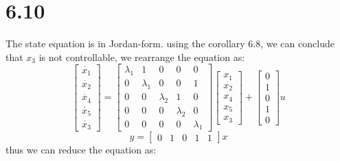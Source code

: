 \documentclass{article}
\begin{document}
\section*{6.10}
The state equation is in Jordan-form.
using the corollary 6.8, we can conclude that $x_3$ is not controllable, we rearrange the equation as:
\[
\left[
    \begin{array}{c}
        \dot{x_1}\\
        \dot{x_2}\\
        \dot{x_4}\\
        \dot{x_5}\\
        \dot{x_3}
    \end{array}
\right]=
\left[
    \begin{array}{ccccc}
    \lambda_1 & 1 & 0 & 0 & 0 \\
    0 & \lambda_1 & 0 & 0 & 1 \\
    0 & 0 & \lambda_2 & 1 & 0 \\
    0 & 0 & 0 & \lambda_2 & 0 \\
    0 & 0 & 0 & 0 & \lambda_1
    \end{array}
\right]
\left[
    \begin{array}{c}
        x_1\\
        x_2\\
        x_4\\
        x_5\\
        x_3
    \end{array}
\right]+
\left[
    \begin{array}{c}
        0\\
        1\\
        0\\
        1\\
        0
    \end{array}
\right]u
\] 
\[
y=
\left[
    \begin{array}{ccccc}
        0 & 1 & 0 & 1 & 1
    \end{array}
\right]x
\]
thus  we can reduce the equation as:
\end{document}
